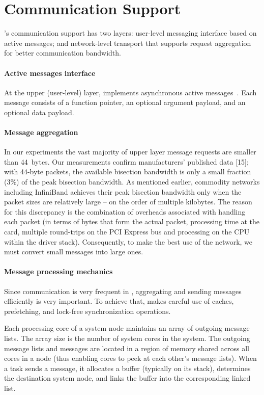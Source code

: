 \section{Communication Support}
\label{sec:communication}

\Grappa's communication support has two layers: user-level messaging interface
based on active messages; and network-level transport that supports request
aggregation for better communication bandwidth.

\paragraph{Active messages interface} At the upper (user-level) layer, \Grappa
implements asynchronous active messages~\cite{vonEicken92}. Each message
consists of a function pointer, an optional argument payload, and an optional
data payload. 

\paragraph{Message aggregation} In our experiments the vast majority of upper
layer message requests are smaller than 44~bytes. Our measurements confirm
manufacturers' published data [15]; with 44-byte packets, the available
bisection bandwidth is only a small fraction (3\%) of the peak bisection
bandwidth. As mentioned earlier, commodity networks including InfiniBand
achieves their peak bisection bandwidth only when the packet sizes are
relatively large -- on the order of multiple kilobytes. The reason for this
discrepancy is the combination of overheads associated with handling each
packet (in terms of bytes that form the actual packet, processing time at the
card, multiple round-trips on the PCI Express bus and processing on the CPU
within the driver stack). Consequently, to make the best use of the network,
we must convert small messages into large ones.

\paragraph{Message processing mechanics} Since communication is very frequent
in \Grappa, aggregating and sending messages efficiently is very important. To
achieve that, \Grappa makes careful use of caches, prefetching, and lock-free
synchronization operations.

Each processing core of a system node maintains an array of outgoing
message lists.  The array size is the number of system cores in the
\Grappa system.  The outgoing message lists and messages are located
in a region of memory shared across all cores in a \Grappa node (thus
enabling cores to peek at each other's message lists). When a task
sends a message, it allocates a buffer (typically on its stack),
determines the destination system node, and links the buffer into the
corresponding linked list.

